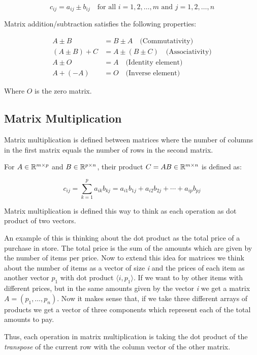 \[
    c_{ij} = a_{ij} \pm b_{ij} \quad \text{for all } i = 1, 2, \ldots, m \text{ and } j = 1, 2, \ldots, n
\]

Matrix addition/subtraction satisfies the following properties:

\begin{align*}
    A \pm B &= B \pm A \quad \text{(Commutativity)} \\
    (A \pm B) + C &= A \pm (B \pm C) \quad \text{(Associativity)} \\
    A \pm O &= A \quad \text{(Identity element)} \\
    A + (-A) &= O \quad \text{(Inverse element)}
\end{align*}

Where \(O\) is the zero matrix.

\subsection{Matrix Multiplication}

Matrix multiplication is defined between matrices where the number of columns in the first 
matrix equals the number of rows in the second matrix.

For \(A \in \mathbb{R}^{m \times p}\) and \(B \in \mathbb{R}^{p \times n}\), their product \(C = AB \in \mathbb{R}^{m \times n}\) is defined as:

\[
    c_{ij} = \sum_{k=1}^{p} a_{ik}b_{kj} = a_{i1}b_{1j} + a_{i2}b_{2j} + \cdots + a_{ip}b_{pj}
\]

Matrix multiplication is defined this way to think as each operation as dot product of two vectors.
\vspace{\baselineskip}

An example of this is thinking about the dot product as the total price of a purchase in store. 
The total price is the sum of the amounts which are given by the number of items per price. Now to extend this idea 
for matrices we think about the number of items as a vector of size \emph{i} and the prices of each item as 
another vector \(p_1\) with dot product \(\langle i, p_1 \rangle\). If we want to by other items with different prices, but in the 
same amounts given by the vector \emph{i} we get a matrix \(A = (p_1, \dots, p_n)\). Now it makes sense that, if 
we take three different arrays of products we get a vector of three components which represent each of the 
total amounts to pay.
\vspace{\baselineskip}

Thus, each operation in matrix multiplication is taking the dot product of the \emph{transpose} 
of the current row with the column vector of the other matrix.

